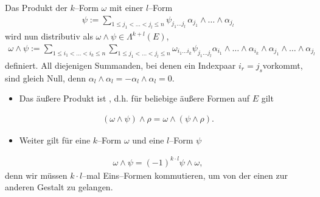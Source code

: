 \documentclass[letterpaper,10pt,english]{jupyterBook}
\begin{document}
\sphinxAtStartPar
Das  
Produkt der \(k\)–Form \(\omega\) mit einer \(l\)–Form
\begin{equation*}
\begin{split}\psi := \sum_{1\leq j_1<\ldots<j_{l}\leq n}\psi_{j_1\ldots j_l}\,
\alpha_{j_1}\wedge\ldots\wedge\alpha_{j_l}\end{split}
\end{equation*}
\sphinxAtStartPar
wird nun distributiv als \(\omega\wedge\psi\in\Lambda^{k+l}(E)\),
\begin{equation*}
\begin{split}\omega\wedge\psi := \sum_{1\leq i_1<\ldots<i_k\leq n} \sum_{1\leq
j_1<\ldots<j_l\leq n} \omega_{i_1\ldots i_k} \psi_{j_1\ldots j_l}
\alpha_{i_1}\wedge\ldots\wedge\alpha_{i_k}\wedge\alpha_{j_1}\wedge
\ldots\wedge\alpha_{j_l}\end{split}
\end{equation*}
\sphinxAtStartPar
definiert. All diejenigen Summanden, bei denen ein Indexpaar \(i_r=j_s\)vorkommt, sind gleich Null, denn \(\alpha_l\wedge\alpha_l = -\alpha_l\wedge\alpha_l=0\).
\begin{itemize}
\item {} 
\sphinxAtStartPar
Das äußere Produkt ist , d.h. für beliebige äußere Formen auf \(E\) gilt

\end{itemize}
\begin{equation*}
\begin{split}(\omega\wedge\psi)\wedge\rho = \omega\wedge(\psi\wedge\rho).\end{split}
\end{equation*}\begin{itemize}
\item {} 
\sphinxAtStartPar
Weiter gilt für eine \(k\)–Form \(\omega\) und eine \(l\)–Form \(\psi\)

\end{itemize}
\begin{equation*}
\begin{split}\omega\wedge\psi = (-1)^{k\cdot l}\psi\wedge\omega,\end{split}
\end{equation*}
\sphinxAtStartPar
denn wir müssen \(k\!\cdot\! l\)–mal Eins–Formen kommutieren, um von der einen
zur anderen Gestalt zu gelangen.
\label{vektoranalysis/multilinear:symplektische Form auf dem $\R^{2n}$}
\end{document}
